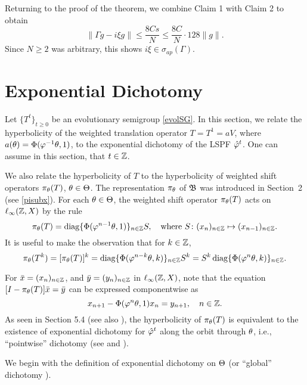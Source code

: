 \begin{pf}
Returning to the proof of the theorem, we combine Claim 1
with Claim 2 to obtain $$\|\Gamma g-i\xi g\|\le \dfrac{8Cs}{N}
\le \dfrac{8C}{N}\cdot 128\|g\|.$$
Since $N\ge 2$ was arbitrary, this shows
$i\xi\in\sigma_{ap}(\Gamma)$.
\end{pf}





\section{Exponential Dichotomy}
\setcounter{equation}{0}

Let $\{T^t\}_{t\ge0}$ be an evolutionary semigroup
\eqref{evolSG}.  In this section, we relate the hyperbolicity of
the weighted translation operator $T=T^1=aV$, where
$a(\theta)=\Phi(\varphi^{-1}\theta,1)$, to the exponential dichotomy
of the LSPF ${\hat{\varphi}}^t$. One can assume in this section, that
$t\in{\Bbb{Z}}$.

We also relate the hyperbolicity of $T$ to the hyperbolicity of
weighted shift operators $\pi_\theta(T)$, $\theta\in \Theta$.  The
representation $\pi_\theta$ of ${\frak{B}}$ was introduced in Section~2
(see \eqref{pisubx}). For each $\theta\in \Theta$,
the weighted shift operator $\pi_\theta(T)$ acts on $\ell_\infty({\Bbb{Z}},X)$
by the rule
\[\pi_\theta(T)=\operatorname{diag}\{\Phi(\varphi^{n-1}\theta,1)\}_{n\in{\Bbb{Z}}}S,
\quad\text{where }
S\colon (x_n)_{n\in{\Bbb{Z}}}\mapsto(x_{n-1})_{n\in{\Bbb{Z}}}.\]
It is useful to make the observation that for $k\in{\Bbb{Z}}$,
\begin{equation}\lb{pixTk}
\pi_\th(T^k)=[\pi_\th(T)]^k
=\diag\{\Phi(\vphi^{n-k}\th,k)\}_{n\in\bbZ}S^k
=S^k\diag\{\Phi(\vphi^n\th,k)\}_{n\in\bbZ}.
\end{equation}

For $\bar x=(x_n)_{n\in{\Bbb{Z}}}$, and $\bar y=(y_n)_{n\in{\Bbb{Z}}}$ in
$\ell_\infty({\Bbb{Z}},X)$, note that the equation $[I-\pi_\theta(T)]\bar x=\bar y$ can be
expressed componentwise as \[ x_{n+1}-\Phi(\varphi^n\theta,1)x_n=y_{n+1},
\quad n\in{\Bbb{Z}}.\] As seen in Section 5.4 (see also
\cite[Prop.~3.22]{LS}), the hyperbolicity of $\pi_\theta(T)$ is equivalent
to the existence of exponential dichotomy for ${\hat{\varphi}}^t$ along the orbit
through $\theta$, i.e., ``pointwise'' dichotomy (see \cite[Theorem
7.6.5]{Henry} and \cite{ChLe1}).

We begin with the definition of exponential dichotomy on $\Theta$
(or ``global'' dichotomy \cite{ChLe1,ChLe2,Henry,HL,Mag,SSBan}).

